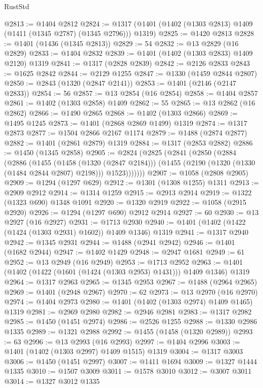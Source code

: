 \begin{lexlean}{RustStd}
\begin{coremodule}
@2813 := @1404 @2812
@2824 := @1317 (@1401 (@1402 (@1303 @2813) @1409 (@1411 (@1345 @2787) (@1345 @2796))) @1319)
@2825 := @1420 @2813
@2828 := @1401 (@1436 (@1345 @2813))
@2829 := 54
@2832 := @13 @2829 (@16 @2829)
@2833 := @1404 @2832
@2839 := @1401 (@1402 (@1303 @2833) @1409 @2120) @1319
@2841 := @1317 (@2828 @2839)
@2842 := @2126 @2833
@2843 := @1625 @2842
@2844 := @2129 @1255
@2847 := @1330 (@1459 @2844 @2807)
@2850 := @2843 (@1320 (@2847 @2141))
@2853 := @1401 (@2146 (@2147 @2833))
@2854 := 56
@2857 := @13 @2854 (@16 @2854)
@2858 := @1404 @2857
@2861 := @1402 (@1303 @2858) @1409
@2862 := 55
@2865 := @13 @2862 (@16 @2862)
@2866 := @1490 @2865
@2868 := @1402 (@1303 @2866)
@2869 := @1495 @1245
@2873 := @1401 (@2868 @2869 @1499) @1319
@2874 := @1317 @2873
@2877 := @1504 @2866 @2167 @1174
@2879 := @1488 (@2874 @2877)
@2882 := @1401 (@2861 @2879) @1319
@2884 := @1317 (@2853 @2882)
@2886 := @1450 (@1345 @2858)
@2905 := @2824
    (@2825
      (@2841
        (@2850
          (@2884
            (@2886
              (@1455
                (@1458 (@1320 (@2847 @2184)))
                (@1455 (@2190 (@1320 (@1330 (@1484 @2844 @2807) @2198))) @1523)))))))
@2907 := @1058 (@2808 @2905)
@2909 := @1294 (@1297 @629)
@2912 := @1301 (@1308 @1255) @1311
@2913 := @2909 @2912
@2914 := @1314 @1259
@2915 := @2913 @2914
@2919 := @1322 (@1323 @690) @1348 @1091
@2920 := @1320 @2919
@2922 := @1058 (@2915 @2920)
@2926 := @1294 (@1297 @690) @2912 @2914
@2927 := 60
@2930 := @13 @2927 (@16 @2927)
@2931 := @1713 @2930
@2940 := @1401 (@1402 (@1422 (@1424 (@1303 @2931) @1602)) @1409 @1346) @1319
@2941 := @1317 @2940
@2942 := @1345 @2931
@2944 := @1488 (@2941 @2942)
@2946 := @1401 (@1682 @2944)
@2947 := @1402 @1429
@2948 := @2947 @1681
@2949 := 61
@2952 := @13 @2949 (@16 @2949)
@2953 := @1713 @2952
@2963 := @1401 (@1402 (@1422 (@1601 (@1424 (@1303 @2953) @1431))) @1409 @1346) @1319
@2964 := @1317 @2963
@2965 := @1345 @2953
@2967 := @1488 (@2964 @2965)
@2969 := @1401 (@2948 @2967)
@2970 := 62
@2973 := @13 @2970 (@16 @2970)
@2974 := @1404 @2973
@2980 := @1401 (@1402 (@1303 @2974) @1409 @1465) @1319
@2981 := @2969 @2980
@2982 := @2946 @2981
@2983 := @1317 @2982
@2985 := @1450 (@1451 @2974)
@2986 := @2526 @1255
@2988 := @1330 @2986 @1335
@2989 := @1321 @2988
@2992 := @1455 (@1458 (@1320 @2989))
@2993 := 63
@2996 := @13 @2993 (@16 @2993)
@2997 := @1404 @2996
@3003 := @1401 (@1402 (@1303 @2997) @1409 @1515) @1319
@3004 := @1317 @3003
@3006 := @1450 (@1451 @2997)
@3007 := @1411 @1694
@3009 := @1327 @1444 @1335
@3010 := @1507 @3009
@3011 := @1578 @3010
@3012 := @3007 @3011
@3014 := @1327 @3012 @1335

\end{coremodule}
\end{lexlean}
